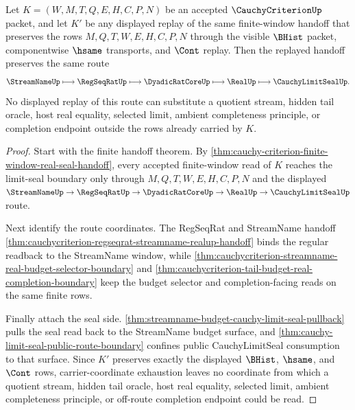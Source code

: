 \begin{theorem}
\label{thm:cauchy-criterion-limit-seal-route-stability}
Let $K=(W,M,T,Q,E,H,C,P,N)$ be an accepted $\CauchyCriterionUp$ packet, and let
$K'$ be any displayed replay of the same finite-window handoff that preserves
the rows $M,Q,T,W,E,H,C,P,N$ through the visible $\BHist$ packet, componentwise
$\hsame$ transports, and $\Cont$ replay. Then the replayed handoff preserves the
same route
$$
\StreamNameUp
\longmapsto \RegSeqRatUp
\longmapsto \DyadicRatCoreUp
\longmapsto \RealUp
\longmapsto \CauchyLimitSealUp .
$$
No displayed replay of this route can substitute a quotient stream, hidden tail
oracle, host real equality, selected limit, ambient completeness principle, or
completion endpoint outside the rows already carried by $K$.
\end{theorem}
\begin{proof}
Start with the finite handoff theorem. By
\autoref{thm:cauchy-criterion-finite-window-real-seal-handoff}, every accepted
finite-window read of $K$ reaches the limit-seal boundary only through
$M,Q,T,W,E,H,C,P,N$ and the displayed
$\StreamNameUp \to \RegSeqRatUp \to \DyadicRatCoreUp \to \RealUp \to
\CauchyLimitSealUp$ route.

Next identify the route coordinates. The RegSeqRat and StreamName handoff
\autoref{thm:cauchycriterion-regseqrat-streamname-realup-handoff} binds the
regular readback to the StreamName window, while
\autoref{thm:cauchycriterion-streamname-real-budget-selector-boundary} and
\autoref{thm:cauchycriterion-tail-budget-real-completion-boundary} keep the
budget selector and completion-facing reads on the same finite rows.

Finally attach the seal side.
\autoref{thm:streamname-budget-cauchy-limit-seal-pullback} pulls the seal read
back to the StreamName budget surface, and
\autoref{thm:cauchy-limit-seal-public-route-boundary} confines public
CauchyLimitSeal consumption to that surface. Since $K'$ preserves exactly the
displayed $\BHist$, $\hsame$, and $\Cont$ rows, carrier-coordinate exhaustion
leaves no coordinate from which a quotient stream, hidden tail oracle, host
real equality, selected limit, ambient completeness principle, or off-route
completion endpoint could be read.
\end{proof}

